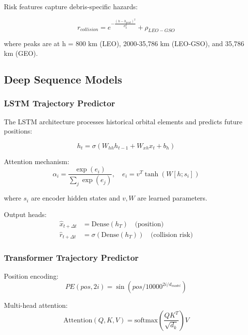 \documentclass[10pt,conference]{IEEEtran}
\begin{document}
Risk features capture debris-specific hazards:

\begin{equation}
r_{collision} = e^{-\frac{(h - h_{peak})^2}{\sigma_h^2}} + \rho_{LEO-GSO}
\end{equation}

where peaks are at h = 800 km (LEO), 2000-35,786 km (LEO-GSO), and 35,786 km (GEO).

\subsection{Deep Sequence Models}

\subsubsection{LSTM Trajectory Predictor}

The LSTM architecture processes historical orbital elements and predicts future positions:

\begin{equation}
h_t = \sigma(W_{hh}h_{t-1} + W_{xh}x_t + b_h)
\end{equation}

Attention mechanism:
\begin{equation}
\alpha_i = \frac{\exp(e_i)}{\sum_j \exp(e_j)}, \quad e_i = v^T \tanh(W[h; s_i])
\end{equation}

where $s_i$ are encoder hidden states and $v, W$ are learned parameters.

Output heads:
\begin{align}
\hat{x}_{t+\Delta t} &= \text{Dense}(h_T) \quad \text{(position)} \\
\hat{r}_{t+\Delta t} &= \sigma(\text{Dense}(h_T)) \quad \text{(collision risk)}
\end{align}

\subsubsection{Transformer Trajectory Predictor}

Position encoding:
\begin{equation}
PE(pos, 2i) = \sin(pos/10000^{2i/d_{model}})
\end{equation}

Multi-head attention:
\begin{equation}
\text{Attention}(Q,K,V) = \text{softmax}\left(\frac{QK^T}{\sqrt{d_k}}\right)V
\end{equation}
\end{document}
